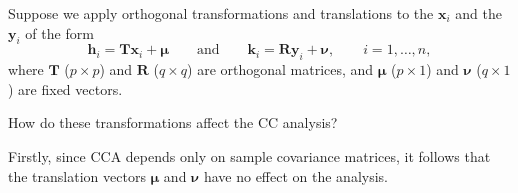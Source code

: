 \documentclass[]{book}
\theoremstyle{definition}
\theoremstyle{definition}
\theoremstyle{definition}
\theoremstyle{remark}
\begin{document}
Suppose we apply orthogonal transformations and translations to the \(\mathbf x_i\) and the \(\mathbf y_i\) of the form
\begin{equation}
{\mathbf h}_i={\mathbf T}\mathbf x_i + {\pmb \mu} \qquad \text{and} \qquad {\mathbf k}_i={\mathbf R}\mathbf y_i +{\pmb \nu},
\qquad i=1,\ldots , n,
\label{eq:transformations}
\end{equation}
where \(\mathbf T\) (\(p \times p\)) and \(\mathbf R\) (\(q \times q\)) are orthogonal matrices, and \(\pmb \mu\) (\(p \times 1\)) and
\(\pmb \nu\) (\(q \times 1\)) are fixed vectors.

How do these transformations affect the CC analysis?

Firstly, since CCA depends only on sample covariance matrices, it follows that the translation vectors \(\pmb \mu\) and \(\pmb \nu\) have no effect on the analysis.
\end{document}
